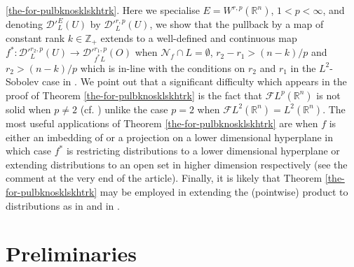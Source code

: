 \documentclass[12pt,reqno]{amsart}
\newcommand{\RR}{\mathbb R}
\newcommand{\ZZ}{\mathbb Z}
\newcommand{\DD}{\mathcal D}
\theoremstyle{plain}
\theoremstyle{remark}
\theoremstyle{definition}
\numberwithin{equation}{section}
\begin{document}
\ref{the-for-pulbknosklskhtrk}. Here we specialise $E=W^{r,p}(\RR^n)$, $1<p<\infty$, and denoting $\DD'^E_L(U)$ by $\DD'^{r,p}_L(U)$, we show that the pullback by a map of constant rank $k\in\ZZ_+$ extends to a well-defined and continuous map $f^*:\DD'^{r_2,p}_L(U)\rightarrow \DD'^{r_1,p}_{f^*L}(O)$ when $\mathcal{N}_f\cap L=\emptyset$, $r_2-r_1>(n-k)/p$ and $r_2>(n-k)/p$ which is in-line with the conditions on $r_2$ and $r_1$ in the $L^2$-Sobolev case in \cite[Theorem 3.21]{PP}. We point out that a significant difficulty which appears in the proof of Theorem \ref{the-for-pulbknosklskhtrk} is the fact that $\mathcal{F}L^p(\RR^n)$ is not solid when $p\neq 2$ (cf. \cite[Theorem (b)]{fefferman}) unlike the case $p=2$ when $\mathcal{F}L^2(\RR^n)=L^2(\RR^n)$. The most useful applications of Theorem \ref{the-for-pulbknosklskhtrk} are when $f$ is either an imbedding of or a projection on a lower dimensional hyperplane in which case $f^*$ is restricting distributions to a lower dimensional hyperplane or extending distributions to an open set in higher dimension respectively (see the comment at the very end of the article). Finally, it is likely that Theorem \ref{the-for-pulbknosklskhtrk} may be employed in extending the (pointwise) product to distributions as in \cite[Theorem 8.2.10, p. 267]{hor} and in \cite{Tutic}.



\section{Preliminaries}
\end{document}
